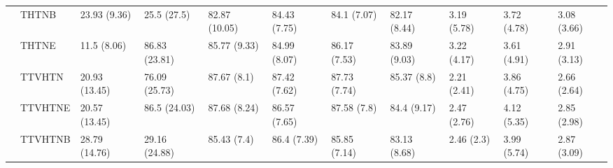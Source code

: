 \begin{table}
\begin{tabular}{lllllllllll}
       & THTNB &   23.93 (9.36) &    25.5 (27.5) &  82.87 (10.05) &  84.43 (7.75) &   84.1 (7.07) &   82.17 (8.44) &      3.19 (5.78) &  3.72 (4.78) &  3.08 (3.66) \\
       & THTNE &    11.5 (8.06) &  86.83 (23.81) &   85.77 (9.33) &  84.99 (8.07) &  86.17 (7.53) &   83.89 (9.03) &      3.22 (4.17) &  3.61 (4.91) &  2.91 (3.13) \\
       & TTVHTN &  20.93 (13.45) &  76.09 (25.73) &    87.67 (8.1) &  87.42 (7.62) &  87.73 (7.74) &    85.37 (8.8) &      2.21 (2.41) &  3.86 (4.75) &  2.66 (2.64) \\
       & TTVHTNE &  20.57 (13.45) &   86.5 (24.03) &   87.68 (8.24) &  86.57 (7.65) &   87.58 (7.8) &    84.4 (9.17) &      2.47 (2.76) &  4.12 (5.35) &  2.85 (2.98) \\
       & TTVHTNB &  28.79 (14.76) &  29.16 (24.88) &    85.43 (7.4) &   86.4 (7.39) &  85.85 (7.14) &   83.13 (8.68) &       2.46 (2.3) &  3.99 (5.74) &  2.87 (3.09) \\
\bottomrule
\end{tabular}
\end{table}
